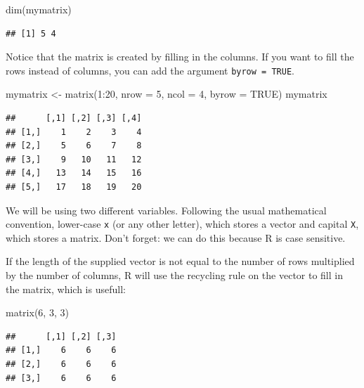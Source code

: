 \documentclass[
]{book}
\newenvironment{Shaded}{\begin{snugshade}}{\end{snugshade}}
\newcommand{\AttributeTok}[1]{\textcolor[rgb]{0.77,0.63,0.00}{#1}}
\newcommand{\ConstantTok}[1]{\textcolor[rgb]{0.00,0.00,0.00}{#1}}
\newcommand{\DecValTok}[1]{\textcolor[rgb]{0.00,0.00,0.81}{#1}}
\newcommand{\FunctionTok}[1]{\textcolor[rgb]{0.00,0.00,0.00}{#1}}
\newcommand{\NormalTok}[1]{#1}
\newcommand{\OtherTok}[1]{\textcolor[rgb]{0.56,0.35,0.01}{#1}}
\newcommand{\SpecialCharTok}[1]{\textcolor[rgb]{0.00,0.00,0.00}{#1}}
\begin{document}
\begin{Shaded}
\begin{Highlighting}[]
\FunctionTok{dim}\NormalTok{(mymatrix)}
\end{Highlighting}
\end{Shaded}

\begin{verbatim}
## [1] 5 4
\end{verbatim}

Notice that the matrix is created by filling in the columns. If you want to fill the rows instead of columns, you can add the argument \texttt{byrow\ =\ TRUE}.

\begin{Shaded}
\begin{Highlighting}[]
\NormalTok{mymatrix }\OtherTok{\textless{}{-}} \FunctionTok{matrix}\NormalTok{(}\DecValTok{1}\SpecialCharTok{:}\DecValTok{20}\NormalTok{, }\AttributeTok{nrow =} \DecValTok{5}\NormalTok{, }\AttributeTok{ncol =} \DecValTok{4}\NormalTok{, }\AttributeTok{byrow =} \ConstantTok{TRUE}\NormalTok{)}
\NormalTok{mymatrix}
\end{Highlighting}
\end{Shaded}

\begin{verbatim}
##      [,1] [,2] [,3] [,4]
## [1,]    1    2    3    4
## [2,]    5    6    7    8
## [3,]    9   10   11   12
## [4,]   13   14   15   16
## [5,]   17   18   19   20
\end{verbatim}

We will be using two different variables. Following the usual mathematical convention, lower-case \texttt{x} (or any other letter), which stores a vector and capital \texttt{X}, which stores a matrix. Don't forget: we can do this because R is case sensitive.

If the length of the supplied vector is not equal to the number of rows multiplied by the number of columns, R will use the recycling rule on the vector to fill in the matrix, which is usefull:

\begin{Shaded}
\begin{Highlighting}[]
\FunctionTok{matrix}\NormalTok{(}\DecValTok{6}\NormalTok{, }\DecValTok{3}\NormalTok{, }\DecValTok{3}\NormalTok{)}
\end{Highlighting}
\end{Shaded}

\begin{verbatim}
##      [,1] [,2] [,3]
## [1,]    6    6    6
## [2,]    6    6    6
## [3,]    6    6    6
\end{verbatim}
\end{document}

